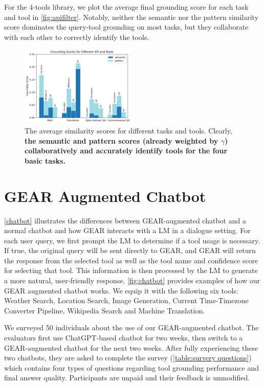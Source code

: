 \documentclass[11pt]{article}
\newcommand{\name}{{\fontfamily{cmss}\selectfont GEAR}}
\begin{document}
For the 4-tools library, we plot the average final grounding score for each task and tool in \autoref{fig:apifilter}. Notably, neither the semantic nor the pattern similarity score dominates the query-tool grounding on most tasks, but they collaborate with each other to correctly identify the tools. 
\begin{figure}[h]
    \centering
    \includegraphics[width=0.49\textwidth]{figures/result.png}
    \caption{The average similarity scores for different tasks and tools. Clearly, \textbf{the semantic and pattern scores (already weighted by $\gamma$) collaboratively and accurately identify tools for the four basic tasks.}}
    \label{fig:apifilter}
\end{figure}

\clearpage
\section{\name{} Augmented Chatbot}
\label{Appendix:chatbot}
\autoref{chatbot} illustrates the differences between \name-augmented chatbot and a normal chatbot and how \name{} interacts with a LM in a dialogue setting. For each user query, we first prompt the LM to determine if a tool usage is necessary. If true, the original query will be sent directly to \name, and \name{} will return the response from the selected tool as well as the tool name and confidence score for selecting that tool. This information is then processed by the LM to generate a more natural, user-friendly response. \autoref{fig:chatbot} provides examples of how our \name{} augmented chatbot works.
We equip it with the following six tools: Weather Search, Location Search, Image Generation, Current Time-Timezone Converter Pipeline, Wikipedia Search and Machine Translation.

We surveyed 50 individuals about the use of our \name{}-augmented chatbot. The evaluators first use ChatGPT-based chatbot for two weeks, then switch to a \name{}-augmented chatbot for the next two weeks. After fully experiencing these two chatbots, they are asked to complete the survey (\autoref{table:survery questions}) which contains four types of questions regarding tool grounding performance and final answer quality. Participants are unpaid and their feedback is unmodified.
\end{document}
